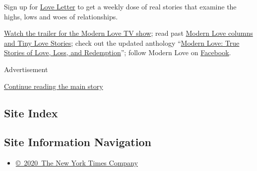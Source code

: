 Sign up for \href{https://www.nytimes.com/newsletters/love-letter}{Love
Letter} to get a weekly dose of real stories that examine the highs,
lows and woes of relationships.

\href{https://www.nytimes.com/2019/09/12/style/modern-love-tv-show-trailer.html}{Watch
the trailer for the Modern Love TV show}; read past
\href{https://www.nytimes.com/column/modern-love}{Modern Love columns
and Tiny Love Stories}; check out the updated anthology
``\href{https://www.penguinrandomhouse.com/books/623036/modern-love-revised-and-updated-by-edited-by-daniel-jones-with-contributions-by-andrew-rannells-ayelet-waldman-amy-krouse-rosenthal-veronica-chambers-and-more/}{Modern
Love: True Stories of Love, Loss, and Redemption}''; follow Modern Love
on \href{https://www.facebook.com/modernlove}{Facebook}.

Advertisement

\protect\hyperlink{after-bottom}{Continue reading the main story}

\hypertarget{site-index}{%
\subsection{Site Index}\label{site-index}}

\hypertarget{site-information-navigation}{%
\subsection{Site Information
Navigation}\label{site-information-navigation}}

\begin{itemize}
\tightlist
\item
  \href{https://help.nytimes.com/hc/en-us/articles/115014792127-Copyright-notice}{©~2020~The
  New York Times Company}
\end{itemize}

